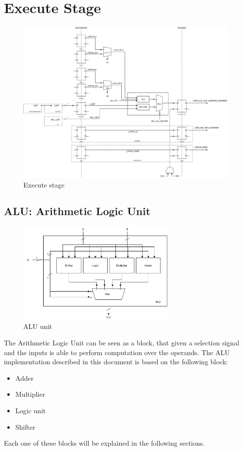 \chapter{Execute Stage}

\begin{figure}[ht]
	\centering
	\includegraphics[width=1\textwidth]{chapters/5_ExecuteStage/images/exe_stage.pdf}
	\caption{Execute stage}
	\label{fig:execute-stage}
\end{figure}

\section{ALU: Arithmetic Logic Unit}
\begin{figure}[h]
	\centering
	\includegraphics[width=0.7\textwidth]{chapters/5_ExecuteStage/images/ALU.pdf}
	\caption{ALU unit}
	\label{fig:ALU}
\end{figure}
The Arithmetic Logic Unit can be seen as a block, that given a selection signal and the inputs is able to perform computation over the operands. The ALU implementation described in this document is based on the following block:
\begin{itemize}
	\itemsep0sp
	\item Adder
	\item Multiplier
	\item Logic unit
	\item Shifter
\end{itemize}
Each one of these blocks will be explained in the following sections.


